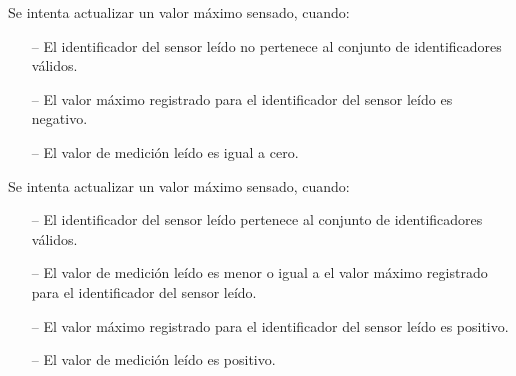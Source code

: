 \begin{tcolorbox}[colback=gray!5!white,colframe=gray!50!black,
  colbacktitle=gray!75!black,title=KeepMaxReading\_SP\_7]
  Se intenta actualizar un valor máximo sensado, cuando:
     \begin{itemize}
        \item[--]{El identificador del sensor leído no pertenece al conjunto de identificadores válidos.}
        \item[--]{El valor máximo registrado para el identificador del sensor leído es negativo.}
        \item[--]{El valor de medición leído es igual a cero.}
     \end{itemize}
\end{tcolorbox}


\begin{tcolorbox}[colback=gray!5!white,colframe=gray!50!black,
  colbacktitle=gray!75!black,title=KeepMaxReading\_SP\_14]
  Se intenta actualizar un valor máximo sensado, cuando:
     \begin{itemize}
        \item[--]{El identificador del sensor leído pertenece al conjunto de identificadores válidos.} 
        \item[--]{El valor de medición leído es menor o igual a el valor máximo registrado para el identificador del sensor leído.}
        \item[--]{El valor máximo registrado para el identificador del sensor leído es positivo.}
        \item[--]{El valor de medición leído es positivo.}
     \end{itemize}
\end{tcolorbox}